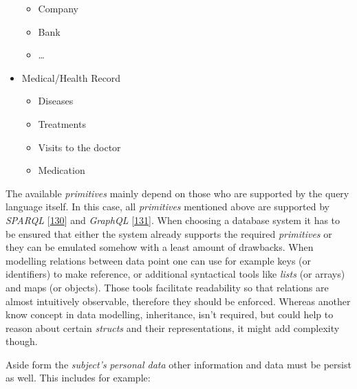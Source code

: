 \documentclass[12pt,english,a4paper,titlepage,cleardoublepage=empty,dottedtoc]{report}
\providecommand{\tightlist}{%
  \setlength{\itemsep}{0pt}\setlength{\parskip}{0pt}}
\begin{document}
\begin{itemize}
  \begin{itemize}
  \tightlist
  \item
    Company
  \item
    Bank
  \item
    \ldots{}
  \end{itemize}
\item
  Medical/Health Record

  \begin{itemize}
  \tightlist
  \item
    Diseases
  \item
    Treatments
  \item
    Visits to the doctor
  \item
    Medication
  \end{itemize}
\end{itemize}

The available \emph{primitives} mainly depend on those who are supported
by the query language itself. In this case, all \emph{primitives}
mentioned above are supported by \emph{SPARQL}
{[}\protect\hyperlink{ref-web_spec_xml_types}{130}{]} and \emph{GraphQL}
{[}\protect\hyperlink{ref-web_spec_graphql_types}{131}{]}. When choosing
a database system it has to be ensured that either the system already
supports the required \emph{primitives} or they can be emulated somehow
with a least amount of drawbacks. When modelling relations between data
point one can use for example keys (or identifiers) to make reference,
or additional syntactical tools like \emph{lists} (or arrays) and maps
(or objects). Those tools facilitate readability so that relations are
almost intuitively observable, therefore they should be enforced.
Whereas another know concept in data modelling, inheritance, isn't
required, but could help to reason about certain \emph{structs} and
their representations, it might add complexity though.

Aside form the \emph{subject's} \emph{personal data} other information
and data must be persist as well. This includes for example:
\end{document}
